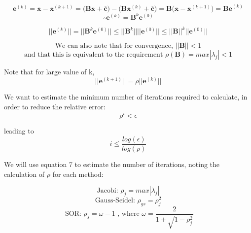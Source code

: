 \documentclass{article}
\begin{document}
\centering

\begin{equation}
\mathbf{e}^{(k)}=\mathbf{\overline{x}}-\mathbf{\overline{x}}^{(k+1)}
=\Big(\mathbf{B}\mathbf{\overline{x}}+\mathbf{\overline{c}}\Big)-\Big(\mathbf{B}\mathbf{\overline{x}}^{(k)}+\mathbf{\overline{c}}\Big)
=\mathbf{B}\Big(\mathbf{\overline{x}}-\mathbf{\overline{x}}^{(k+1)}\Big)
=\mathbf{Be}^{(k)}
\end{equation}
%
\begin{equation}
\therefore \mathbf{e}^{(k)}=\mathbf{B}^k\mathbf{e}^{(0)}
\end{equation}
\vspace{0.5cm}


\begin{equation}
||\mathbf{e}^{(k)}||=||\mathbf{B}^k\mathbf{e}^{(0)}||
\le||\mathbf{B}^k|| ||\mathbf{e}^{(0)}||
\le||\mathbf{B}||^k ||\mathbf{e}^{(0)}||
\end{equation}

\begin{equation}
\text{We can also note that  for convergence,   }
||\mathbf{B}|| < 1
\end{equation}
%
\begin{equation}
\text{and that this is equivalent to the requirement }
\rho(\mathbf{B}) = max|\lambda_j|< 1
\end{equation}

\vspace{0.5cm}
Note that for large value of k,
\begin{equation*}
||\mathbf{e}^{(k+1)}|| = \rho ||\mathbf{e}^{(k)}||
\end{equation*}

We want to estimate the minimum number of iterations required to calculate, in order to reduce the relative error:
\begin{equation}
\rho^i < \epsilon
\end{equation}

leading to
\begin{equation}
i \le \frac{log(\epsilon)}{log(\rho)}
\end{equation}
 
 We will use equation 7 to estimate the number of iterations, noting the calculation of $\rho$ for each method:

 \begin{equation*}
 \text{Jacobi:   }
 \rho_j = max|\lambda_j|
 \end{equation*}
 \begin{equation*}
   \text{Gauss-Seidel:   }
 \rho_{gs} = \rho_j^2
 \end{equation*}
  \begin{equation*}
  \text{ SOR:   }
 \rho_{s} = \omega - 1 \text{ , where } \omega = \frac{2}{1+\sqrt{1-\rho_j^2}}
 \end{equation*}
 
\end{document}
